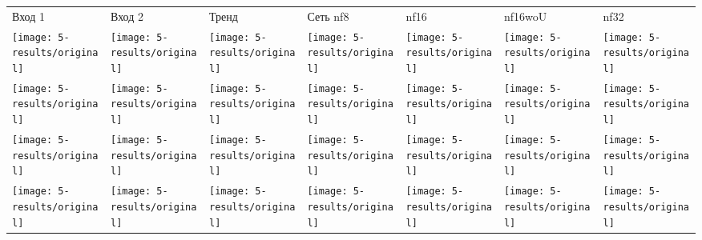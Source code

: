 			\begin{table}[h!]
				\begin{center}
					\begin{tabular}{p{2cm} p{2cm} p{2cm} p{2cm} p{2cm} p{2cm} p{2cm}}
						\toprule
						Вход 1 & Вход 2 & Тренд & Сеть nf8 & nf16 & nf16woU & nf32 \\
						\cmidrule(r){1-1}\cmidrule(lr){2-2}\cmidrule(lr){3-3}\cmidrule(lr){4-4}\cmidrule(lr){5-5}\cmidrule(lr){6-6}\cmidrule(l){7-7}
						\texttt{[image: 5-results/original]}
						&
						\texttt{[image: 5-results/original]}
						&
						\texttt{[image: 5-results/original]}
						&
						\texttt{[image: 5-results/original]}
						&
						\texttt{[image: 5-results/original]}
						&
						\texttt{[image: 5-results/original]}
						&
						\texttt{[image: 5-results/original]}
						\\
						\texttt{[image: 5-results/original]}
						&
						\texttt{[image: 5-results/original]}
						&
						\texttt{[image: 5-results/original]}
						&
						\texttt{[image: 5-results/original]}
						&
						\texttt{[image: 5-results/original]}
						&
						\texttt{[image: 5-results/original]}
						&
						\texttt{[image: 5-results/original]}
						\\
						\texttt{[image: 5-results/original]}
						&
						\texttt{[image: 5-results/original]}
						&
						\texttt{[image: 5-results/original]}
						&
						\texttt{[image: 5-results/original]}
						&
						\texttt{[image: 5-results/original]}
						&
						\texttt{[image: 5-results/original]}
						&
						\texttt{[image: 5-results/original]}
						\\
						\texttt{[image: 5-results/original]}
						&
						\texttt{[image: 5-results/original]}
						&
						\texttt{[image: 5-results/original]}
						&
						\texttt{[image: 5-results/original]}
						&
						\texttt{[image: 5-results/original]}
						&
						\texttt{[image: 5-results/original]}
						&
						\texttt{[image: 5-results/original]}
						\\

\end{tabular}
\end{center}
\end{table}
